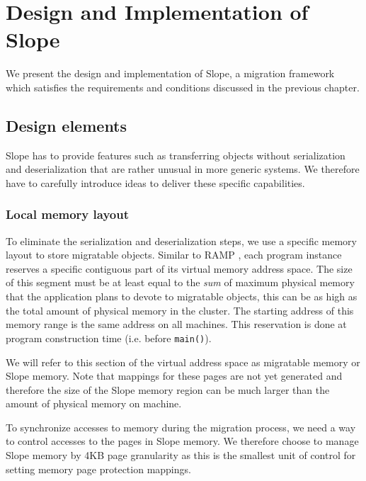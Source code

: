 \chapter{Design and Implementation of Slope}
\label{chap:design}


We present the design and implementation of Slope, a migration framework which
satisfies the requirements and conditions discussed in the previous chapter.

\section{Design elements}
\label{sec:deselem}
Slope has to provide features such as transferring objects without serialization
and deserialization that are rather unusual in more generic systems. We
therefore have to carefully introduce ideas to deliver these specific capabilities.

\subsection{Local memory layout}
\label{sec:localmem}
To eliminate the serialization and deserialization steps, we use a specific
memory layout to store migratable objects.
Similar to RAMP \cite{memon2018ramp}, each program instance reserves a
specific contiguous part of its virtual memory address space. The size of this
segment must be at least equal to the \emph{sum} of maximum physical memory that the
application plans to devote to migratable objects, this can be
as high as the total amount of physical memory in the cluster.
The starting address of this memory range is the same address on all machines.
This reservation is done at program construction time
(i.e. before \texttt{main()}).

We will refer to this section of the virtual
address space as migratable memory or Slope memory. Note that mappings for
these pages are not yet generated and therefore the size of the Slope memory
region can be much larger than the amount of physical memory on machine.

To synchronize accesses to memory during the migration process, we need a way
to control accesses to the pages in Slope memory. We therefore choose to manage
Slope memory by 4KB page granularity as this is the smallest unit of control
for setting memory page protection mappings.

